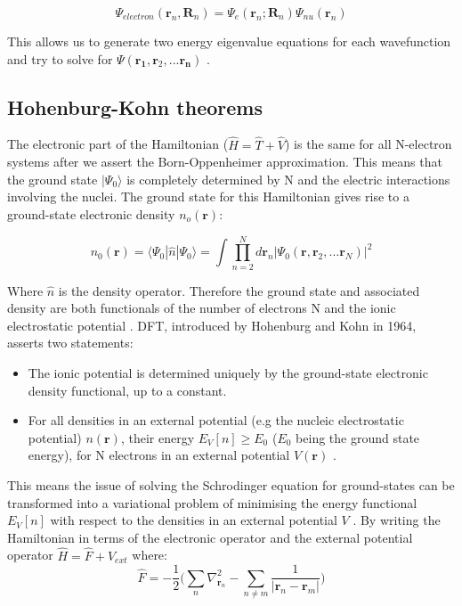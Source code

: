 \documentclass[10pt]{article}
\begin{document}
\begin{equation*}
	\Psi_{electron}(\textbf{r}_n,\textbf{R}_n) =  \Psi_e(\textbf{r}_n;\textbf{R}_n)\Psi_{nu}(\textbf{r}_{n})
\end{equation*}

This allows us to generate two energy eigenvalue equations for each wavefunction and try to solve for $\Psi(\mathbf{r_1},\mathbf{r}_2,...\mathbf{r_n})$ \cite{rebolini2014range}. 

\subsection{Hohenburg-Kohn theorems}

The electronic part of the Hamiltonian ($\hat{H}=\hat{T}+\hat{V}$) is the same for all N-electron systems after we assert the Born-Oppenheimer approximation. This means that the ground state $|\Psi_0\rangle$ is completely determined by N and the electric interactions involving the nuclei. The ground state for this Hamiltonian gives rise to a ground-state electronic density $n_o(\mathbf{r})$:

\begin{equation*}
	n_0(\mathbf{r})=\langle\Psi_0|\hat{n}|\Psi_0\rangle = \int\prod_{n=2}^{N}d\mathbf{r}_n|\Psi_0(\mathbf{r},\mathbf{r}_2,...\mathbf{r}_N)|^2
\end{equation*}

Where $\hat{n}$ is the density operator. Therefore the ground state and associated density are both functionals of the number of electrons N and the ionic electrostatic potential . DFT, introduced by Hohenburg and Kohn in 1964, asserts two statements:

\begin{itemize}
	\item The ionic potential is determined uniquely by the ground-state electronic density functional, up to a constant.
	\item For all densities in an external potential (e.g the nucleic electrostatic potential) $n(\mathbf{r})$, their energy $E_V[n]\geq E_0$ ($E_0$ being the ground state energy), for N electrons in an external potential $V(\mathbf{r})$ \cite{haynes}. 
\end{itemize}

This means the issue of solving the Schrodinger equation for ground-states can be transformed into a variational problem of minimising the energy functional $E_V[n]$ with respect to the densities in an external potential $V$ \cite{hohenberg1964inhomogeneous}. By writing the Hamiltonian in terms of the electronic operator and the external potential operator $\hat{H} = \hat{F}+\hat{V}_{ext}$ where: $$\hat{F} = -\frac{1}{2}\biggr(\sum_n\nabla^2_{\textbf{r}_n}-\sum_{n\not=m}\frac{1}{|\textbf{r}_n-\textbf{r}_m|}\biggr)$$
\end{document}
